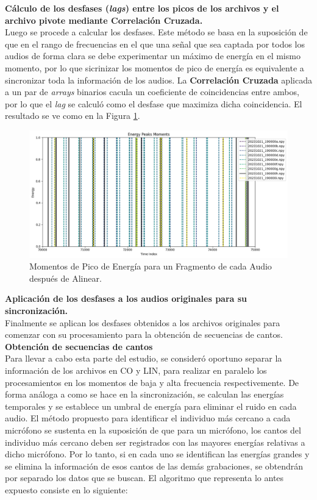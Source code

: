 \documentclass[a4paper,10pt,twocolumn]{article}
\begin{document}
\textbf{Cálculo de los desfases (\textit{lags}) entre los picos de los archivos y el archivo pivote mediante Correlación Cruzada.}\\

Luego se procede a calcular los desfases. Este método se basa en la suposición de que 
en el rango de frecuencias en el que una señal que sea captada por todos los audios de forma clara
se debe experimentar un máximo de energía en el mismo momento, por lo que sicrinizar los momentos de pico de 
energía es equivalente a sincronizar toda la información de los audios. La \textbf{Correlación Cruzada}
aplicada a un par de \textit{arrays} binarios cacula un coeficiente de coincidencias entre ambos, por lo que 
el \textit{lag} se calculó como el desfase que maximiza dicha coincidencia. El resultado se ve como en la Figura \ref{fig:peaksafter}.

\begin{figure}[h!]
    \centering
    \includegraphics[width=\columnwidth]{assets/peaks_after.png}
    \caption{Momentos de Pico de Energía para un Fragmento de cada Audio después de Alinear.}
    \label{fig:peaksafter}
\end{figure}

\textbf{Aplicación de los desfases a los audios originales para su sincronización.}\\

Finalmente se aplican los desfases obtenidos a los archivos originales para comenzar con su procesamiento para la obtención de secuencias de cantos.\\



\textbf{Obtención de secuencias de cantos}\\

Para llevar a cabo esta parte del estudio, se consideró oportuno
separar la información de los archivos en CO y LIN, para 
realizar en paralelo los procesamientos en los momentos de baja y alta frecuencia respectivemente.
De forma análoga a como se hace en la sincronización, se calculan las
energías temporales y se establece un umbral de energía para
eliminar el ruido en cada audio. El método propuesto para identificar
el individuo más cercano a cada micrófono se sustenta en la suposición de que
para un micrófono, los cantos del individuo más cercano deben ser registrados con las
mayores energías relativas a dicho micrófono. Por lo tanto, si en cada uno se identifican 
las energías grandes y se elimina la información de esos cantos de las demás grabaciones,
se obtendrán por separado los datos que se buscan.
El algoritmo que representa lo antes expuesto consiste en lo siguiente:
\end{document}
